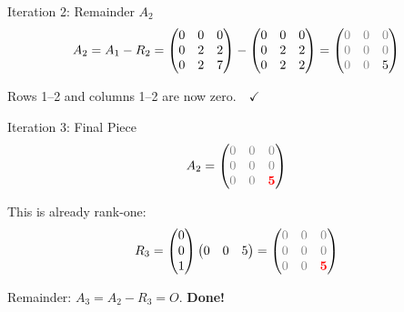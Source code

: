 \documentclass[10pt]{beamer}
\theoremstyle{definition}
\newcommand{\pvt}[1]{{\color{red}\mathbf{#1}}}       %
\newcommand{\rem}[1]{{\color{gray}#1}}                %
\newcommand{\x}[1]{\alert{\textbf{#1}}}
\begin{document}
\begin{frame}{Iteration 2: Remainder $A_2$}
$$A_2 = A_1 - R_2 = \begin{pmatrix}
0 & 0 & 0 \\
0 & 2 & 2 \\
0 & 2 & 7
\end{pmatrix}
- \begin{pmatrix}
0 & 0 & 0 \\
0 & 2 & 2 \\
0 & 2 & 2
\end{pmatrix}
= \begin{pmatrix}
\rem{0} & \rem{0} & \rem{0} \\
\rem{0} & \rem{0} & \rem{0} \\
\rem{0} & \rem{0} & 5
\end{pmatrix}$$

\vfill
Rows 1--2 and columns 1--2 are now \rem{zero}.\ \ $\checkmark$
\end{frame}

\begin{frame}{Iteration 3: Final Piece}
$$A_2 = \begin{pmatrix}
\rem{0} & \rem{0} & \rem{0} \\
\rem{0} & \rem{0} & \rem{0} \\
\rem{0} & \rem{0} & \pvt{5}
\end{pmatrix}$$

\vfill
This is already rank-one:
$$R_3 = \begin{pmatrix} 0 \\ 0 \\ 1 \end{pmatrix}
\begin{pmatrix} 0 & 0 & 5 \end{pmatrix}
= \begin{pmatrix}
\rem{0} & \rem{0} & \rem{0} \\
\rem{0} & \rem{0} & \rem{0} \\
\rem{0} & \rem{0} & \pvt{5}
\end{pmatrix}$$

Remainder: $A_3 = A_2 - R_3 = O$. \quad \x{Done!}
\end{frame}
\end{document}
